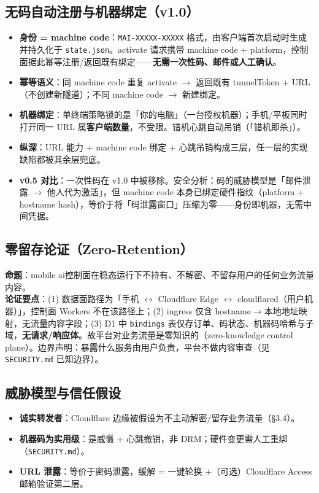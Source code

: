 \documentclass[10pt,a4paper]{article}
\newcommand{\sys}{mobile ai}
\begin{document}
\subsection{无码自动注册与机器绑定（v1.0）}
\begin{itemize}[leftmargin=1.6em,itemsep=0.2em,topsep=0.2em]
  \item \textbf{身份 = machine code}：\texttt{MAI-XXXXX-XXXXX} 格式，由客户端首次启动时生成并持久化于 \texttt{state.json}。activate 请求携带 machine code + platform，控制面据此幂等注册/返回既有绑定——\textbf{无需一次性码、邮件或人工确认}。
  \item \textbf{幂等语义}：同 machine code 重复 activate $\rightarrow$ 返回既有 tunnelToken + URL（不创建新隧道）；不同 machine code $\rightarrow$ 新建绑定。
  \item \textbf{机器绑定}：单终端策略锁的是「你的电脑」（一台授权机器）；手机/平板同时打开同一 URL 属\textbf{客户端数量}，不受限。错机心跳自动吊销（「错机即杀」）。
  \item \textbf{纵深}：URL 能力 + machine code 绑定 + 心跳吊销构成三层，任一层的实现缺陷都被其余层兜底。
  \item \textbf{v0.5 对比}：一次性码在 v1.0 中被移除。安全分析：码的威胁模型是「邮件泄露 $\rightarrow$ 他人代为激活」，但 machine code 本身已绑定硬件指纹（platform + hostname hash），等价于将「码泄露窗口」压缩为零——身份即机器，无需中间凭据。
\end{itemize}

\subsection{零留存论证（Zero-Retention）}
\noindent\textbf{命题}：\sys 控制面在稳态运行下不持有、不解密、不留存用户的任何业务流量内容。\\
\noindent\textbf{论证要点}：(1) 数据面路径为「手机 $\leftrightarrow$ Cloudflare Edge $\leftrightarrow$ cloudflared（用户机器）」，控制面 Workers 不在该路径上；(2) ingress 仅含 hostname$\rightarrow$本地地址映射，无流量内容字段；(3) D1 中 \texttt{bindings} 表仅存订单、码状态、机器码哈希与子域，\textbf{无请求/响应体}。故平台对业务流量是零知识的（zero-knowledge control plane）。边界声明：暴露什么服务由用户负责，平台不做内容审查（见 \texttt{SECURITY.md} 已知边界）。

\subsection{威胁模型与信任假设}
\begin{itemize}[leftmargin=1.6em,itemsep=0.2em,topsep=0.2em]
  \item \textbf{诚实转发者}：Cloudflare 边缘被假设为不主动解密/留存业务流量（§3.4）。
  \item \textbf{机器码为实用级}：是威慑 + 心跳撤销，非 DRM；硬件变更需人工重绑（\texttt{SECURITY.md}）。
  \item \textbf{URL 泄露}：等价于密码泄露，缓解 = 一键轮换 +（可选）Cloudflare Access 邮箱验证第二层。
\end{itemize}
\end{document}
